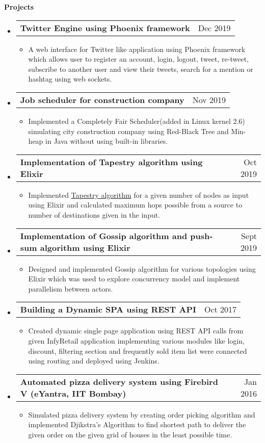 \documentclass[letterpaper,12pt]{article}[leftmargin=*]
\makeatletter
\def \entryspacing {-2pt}
\def \entryspacingnew {-4pt}
\renewcommand{\section}[2]{\vspace{5pt}
  \colorbox{secondary}{\color{white}\raggedbottom\normalsize\textbf{{#1}{\hspace{7pt}#2}}}
}
\newcommand{\resumeEntryStart}{\begin{itemize}[leftmargin=2.5mm]\vspace{\entryspacingnew}}
\newcommand{\resumeEntryEnd}{\end{itemize}\vspace{\entryspacingnew}}
\newcommand{\resumeItemListStart}{\begin{itemize}[leftmargin=4.5mm]}
\newcommand{\resumeItemListEnd}{\end{itemize}\vspace{\entryspacing}}
\newcommand{\resumeItem}[1]{
  \item\small{
    {#1 \vspace{-2pt}}
  }
}
\newcommand{\resumeEntryTD}[2]{
  \vspace{-1pt}\item[]
    \begin{tabular*}{0.97\textwidth}{l@{\extracolsep{\fill}}r}
      \textbf{\color{primary}#1} & {\firabook\color{accent}\small#2} \\
    \end{tabular*}\vspace{-10pt}
}
\makeatother
\begin{document}

\hspace{-15pt}\section{\faFlask}{Projects}
\vspace{-3pt}
  \resumeEntryStart
    \resumeEntryTD
      {Twitter Engine using Phoenix framework}{Dec 2019}
    \resumeItemListStart
      \resumeItem {A web interface for Twitter like application using Phoenix framework which allows user to register an account, login, logout, tweet, re-tweet, subscribe to another user and view their tweets, search for a mention or hashtag using web sockets.}
    \resumeItemListEnd
  \resumeEntryEnd
\vspace{-2pt}
  \resumeEntryStart
   \resumeEntryTD
      {Job scheduler for construction company}{Nov 2019}
    \resumeItemListStart
      \resumeItem {Implemented a Completely Fair Scheduler(added in Linux kernel 2.6) simulating city construction company using Red-Black Tree and Min- heap in Java without using built-in libraries.}
    \resumeItemListEnd
  \resumeEntryEnd

  \resumeEntryStart
    \resumeEntryTD
      {Implementation of Tapestry algorithm using Elixir}{Oct 2019}
    \resumeItemListStart
      \resumeItem {Implemented \href{ https://pdos.csail.mit.edu/~strib/docs/tapestry/tapestry_jsac03.pdf}{Tapestry algorithm} for a given number of nodes as input using Elixir and calculated maximum hops possible from a source to number of destinations given in the input.}
    \resumeItemListEnd
  \resumeEntryEnd

  \resumeEntryStart
    \resumeEntryTD
      {Implementation of Gossip algorithm and push-sum algorithm using Elixir}{Sept 2019}
    \resumeItemListStart
      \resumeItem {Designed and implemented Gossip algorithm for various topologies using Elixir which was used to explore concurrency model and implement parallelism between actors. }
    \resumeItemListEnd
  \resumeEntryEnd
   \resumeEntryStart
    \resumeEntryTD
      {Building a Dynamic SPA using REST API}{Oct 2017}
    \resumeItemListStart
      \resumeItem {Created dynamic single page application using REST API calls from given InfyRetail application implementing various modules like login, discount, filtering section and frequently sold item list were connected using routing and deployed using Jenkins.}
    \resumeItemListEnd
  \resumeEntryEnd
   \resumeEntryStart
    \resumeEntryTD
      {Automated pizza delivery system using Firebird V (eYantra, IIT Bombay)}{Jan 2016}
    \resumeItemListStart
      \resumeItem {Simulated pizza delivery system by creating order picking algorithm and implemented Djikstra’s Algorithm to find shortest path to deliver the given order on the given grid of houses in the least possible time.}
    \resumeItemListEnd
  \resumeEntryEnd
  
\end{document}
